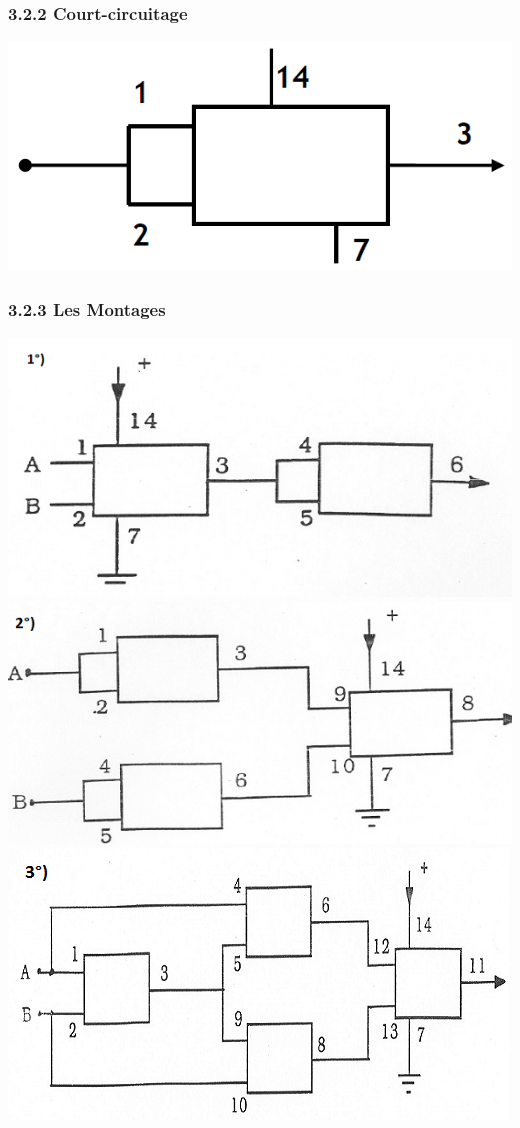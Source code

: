 \documentclass{report}
\begin{document}
\subsubsection*{3.2.2 Court-circuitage}
\includegraphics[scale=1]{Court-circuit.png} 
\subsubsection*{3.2.3 Les Montages}
\includegraphics[scale=1]{CirInt2.png} 
\includegraphics[scale=1]{CirInt3.png} 
\includegraphics[scale=1]{CirInt4.png} 
\end{document}
